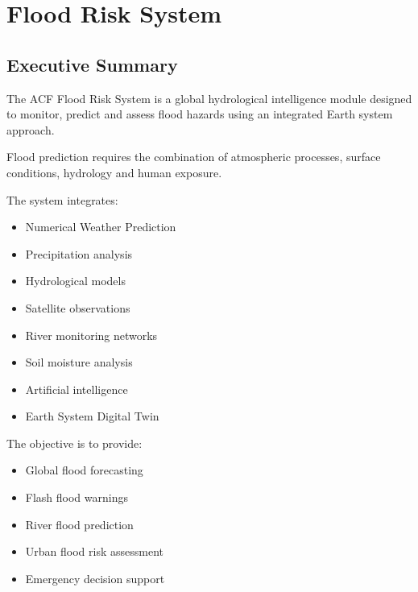 
\section{Flood Risk System}

\subsection{Executive Summary}

The ACF Flood Risk System is a global hydrological intelligence module
designed to monitor, predict and assess flood hazards using an integrated
Earth system approach.

Flood prediction requires the combination of atmospheric processes,
surface conditions, hydrology and human exposure.

The system integrates:

\begin{itemize}

\item Numerical Weather Prediction

\item Precipitation analysis

\item Hydrological models

\item Satellite observations

\item River monitoring networks

\item Soil moisture analysis

\item Artificial intelligence

\item Earth System Digital Twin

\end{itemize}


The objective is to provide:

\begin{itemize}

\item Global flood forecasting

\item Flash flood warnings

\item River flood prediction

\item Urban flood risk assessment

\item Emergency decision support

\end{itemize}


